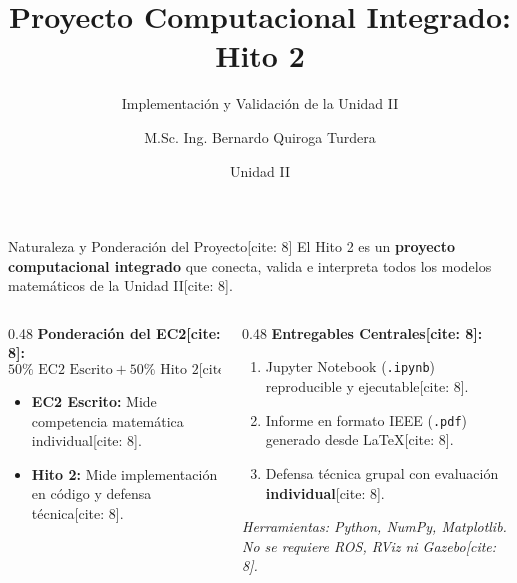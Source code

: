 \documentclass[aspectratio=169, xcolor={table,xcdraw}]{beamer}
\title[Hito 2]{Proyecto Computacional Integrado: Hito 2}
\subtitle{Implementación y Validación de la Unidad II}
\author[IMT-342]{M.Sc. Ing. Bernardo Quiroga Turdera}
\institute[UCB Tarija]{Universidad Católica Boliviana ``San Pablo'' — Sede Tarija}
\date{Unidad II}
\begin{document}
\begin{frame}
    \titlepage
\end{frame}

\begin{frame}{Naturaleza y Ponderación del Proyecto[cite: 8]}
    El Hito 2 es un \textbf{proyecto computacional integrado} que conecta, valida e interpreta todos los modelos matemáticos de la Unidad II[cite: 8].
    
    \vspace{0.3cm}
    \begin{columns}[T]
        \begin{column}{0.48\textwidth}
            \textbf{Ponderación del EC2[cite: 8]:}
            \begin{equation*}
                \boxed{ 50\% \text{ EC2 Escrito} + 50\% \text{ Hito 2} } \text{[cite: 8]}
            \end{equation*}
            \begin{itemize}
                \item \textbf{EC2 Escrito:} Mide competencia matemática individual[cite: 8].
                \item \textbf{Hito 2:} Mide implementación en código y defensa técnica[cite: 8].
            \end{itemize}
        \end{column}
        \begin{column}{0.48\textwidth}
            \textbf{Entregables Centrales[cite: 8]:}
            \begin{enumerate}
                \item Jupyter Notebook (\texttt{.ipynb}) reproducible y ejecutable[cite: 8].
                \item Informe en formato IEEE (\texttt{.pdf}) generado desde LaTeX[cite: 8].
                \item Defensa técnica grupal con evaluación \textbf{individual}[cite: 8].
            \end{enumerate}
            \vspace{0.2cm}
            \footnotesize \textit{Herramientas: Python, NumPy, Matplotlib. No se requiere ROS, RViz ni Gazebo[cite: 8].}
        \end{column}
    \end{columns}
\end{frame}
\end{document}

